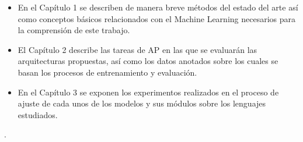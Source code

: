 \begin{itemize}
	\item En el Capítulo 1 se describen de manera breve métodos del estado del arte así como conceptos básicos relacionados con el Machine Learning necesarios para la comprensión de este trabajo.
	\item El Capítulo 2 describe las tareas de AP en las que se evaluarán las arquitecturas propuestas, así como los datos anotados sobre los cuales se basan los procesos de entrenamiento y evaluación.
	\item En el Capítulo 3 se exponen los experimentos realizados en el proceso de ajuste de cada unos de los modelos y sus módulos sobre los lenguajes estudiados. 
\end{itemize}
. 
